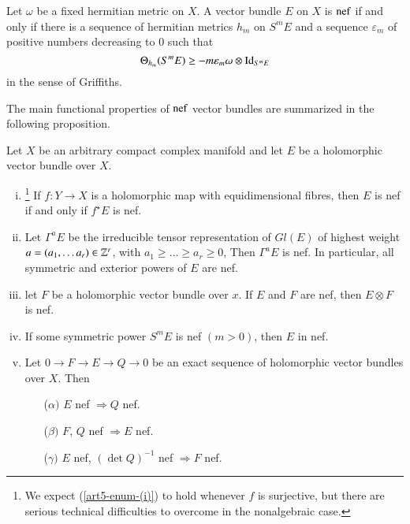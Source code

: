 \begin{criterion}\label{art5-definition-1.5}
Let $\omega$ be a fixed hermitian metric on $X$. A vector bundle $E$ on $X$ is $\operatorname{nef}$ if and only if there is a sequence of hermitian metrics $h_{m}$ on $S^{m}E$ and a sequence $\varepsilon_{m}$ of positive numbers decreasing to 0 such that
$$
\Theta_{h_{m}}(S^{m} E) \geq -m\varepsilon_{m}\omega\otimes \operatorname{Id}_{S^{m} E}
$$
in the sense of Griffiths.

The main functional properties of $\operatorname{nef}$ vector bundles are summarized in the following proposition.
\end{criterion}

\begin{prop}\label{art5-definition-1.6}
Let $X$ be an arbitrary compact complex manifold and let $E$ be a  holomorphic vector bundle over $X$.
\begin{enumerate}[(i)]
\item \footnote{We expect (\ref{art5-enum-(i)}) to hold whenever $f$ is surjective, but there are serious technical difficulties to overcome in the nonalgebraic case.} If $f: Y\rightarrow X$ is a holomorphic map with equidimensional fibres, then $E$ is nef if and only if $f^{\star}E$ is nef.\label{art5-enum-(i)}
\item Let $\Gamma^{a}E$ be the irreducible tensor representation of $Gl(E)$ of highest weight $a= (a_{1}, \ldots a_{r}) \in \mathbb{Z}^{r}$, with $a_{1}\geq\ldots\geq a_{r} \geq 0$, Then $\Gamma^{a}E$ is nef. In particular, all symmetric and exterior powers of $E$ are nef.\label{art5-enum-(ii)}
\item let $F$ be a holomorphic vector bundle over $x$. If $E$ and $F$ are nef, then $E\otimes F$ is nef.\label{art5-enum-(iii)}

\item If some symmetric power $S^{m}E$ is nef $(m > 0)$, then $E$ in nef. \label{art5-enum-(iv)}

\item Let $0 \rightarrow F \rightarrow E \rightarrow Q \rightarrow 0$ be an exact sequence of holomorphic vector bundles over $X$. Then\label{art5-enum-(v)}
    \begin{enumerate}
        \item[($\alpha)$] $E$ nef $\Rightarrow Q$ nef.
        \item [($\beta)$] $F$, $Q$ nef $\Rightarrow E$ nef.
        \item [($\gamma)$] $E$ nef, $(\det Q)^{-1}$ nef $\Rightarrow F$ nef.
    \end{enumerate}
\end{enumerate}
\end{prop}

